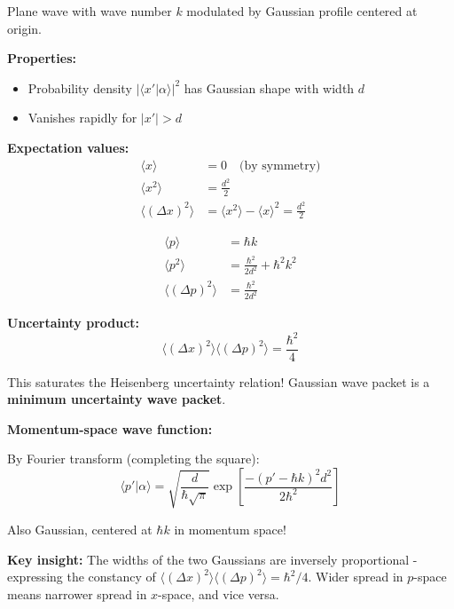 \documentclass[11pt,a4paper]{article}
\begin{document}
Plane wave with wave number $k$ modulated by Gaussian profile centered at origin.

\textbf{Properties:}
\begin{itemize}
\item Probability density $|\langle x'|\alpha\rangle|^2$ has Gaussian shape with width $d$
\item Vanishes rapidly for $|x'| > d$
\end{itemize}

\textbf{Expectation values:}
\begin{align}
\langle x \rangle &= 0 \quad \text{(by symmetry)} \tag{1.268} \\
\langle x^2 \rangle &= \frac{d^2}{2} \tag{1.269} \\
\langle(\Delta x)^2\rangle &= \langle x^2\rangle - \langle x\rangle^2 = \frac{d^2}{2} \tag{1.270}
\end{align}

\begin{align}
\langle p \rangle &= \hbar k \tag{1.271a} \\
\langle p^2 \rangle &= \frac{\hbar^2}{2d^2} + \hbar^2k^2 \tag{1.271b} \\
\langle(\Delta p)^2\rangle &= \frac{\hbar^2}{2d^2} \tag{1.272}
\end{align}

\textbf{Uncertainty product:}
\begin{equation}
\boxed{\langle(\Delta x)^2\rangle\langle(\Delta p)^2\rangle = \frac{\hbar^2}{4}}
\tag{1.273}
\end{equation}

This saturates the Heisenberg uncertainty relation! Gaussian wave packet is a \textbf{minimum uncertainty wave packet}.

\textbf{Momentum-space wave function:}

By Fourier transform (completing the square):
\begin{equation}
\langle p'|\alpha\rangle = \sqrt{\frac{d}{\hbar\sqrt{\pi}}}\exp\left[\frac{-(p' - \hbar k)^2d^2}{2\hbar^2}\right]
\tag{1.274}
\end{equation}

Also Gaussian, centered at $\hbar k$ in momentum space!

\textbf{Key insight:} The widths of the two Gaussians are inversely proportional - expressing the constancy of $\langle(\Delta x)^2\rangle\langle(\Delta p)^2\rangle = \hbar^2/4$. Wider spread in $p$-space means narrower spread in $x$-space, and vice versa.
\end{document}
